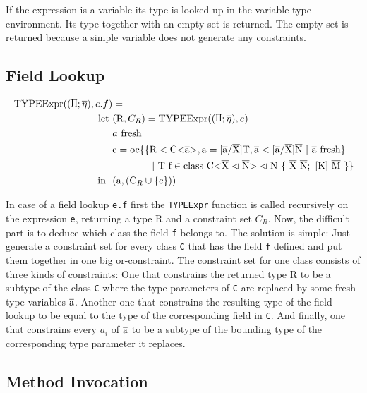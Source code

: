 If the expression is a variable its type is looked up in the variable type environment. Its type together with an empty set is returned. The empty set is returned because a simple variable does not generate any constraints.

\subsection{Field Lookup}

\begin{align*}
    \texpr{e.f} &= \\
    \text{let} \ &( \text{R}, C_R ) = \texpr{e} \\
    &\fresh{a} \\
    &\text{c} = \text{oc} \{ \{ \text{R} < \text{C<} \ot{a} \text{>}, \text{a} = \tsxsn{a}{X}{T}, \ot{a} < \tsxsns{a}{X}{N} \ | \ \fresh{\ot{a}} \} \\
    & \quad \quad \quad \quad | \ \text{T f} \in \class{X}{N} \}\\
    \text{in} \ \ & (\text{a}, (\text{C}_R \cup \{ \text{c} \} ))
\end{align*}

In case of a field lookup \verb|e.f| first the \verb|TYPEExpr| function is called recursively on the expression \verb|e|, returning a
type R and a constraint set $C_R$. Now, the difficult part is to deduce which class the field \verb|f| belongs to. The solution is simple:
Just generate a constraint set for every class \verb|C| that has the field \verb|f| defined and put them together in one big or-constraint.
The constraint set for one class consists of three kinds of constraints: One that constrains the returned type R to be a subtype
of the class \verb|C| where the type parameters of \verb|C| are replaced by some fresh type variables $\overline{\text{a}}$. Another one that constrains the resulting type of the field lookup
to be equal to the type of the corresponding field in \verb|C|. And finally, one that constrains every $a_i$ of $\overline{\text{a}}$ to be a subtype of the bounding type of the corresponding type parameter it replaces.

\subsection{Method Invocation}

